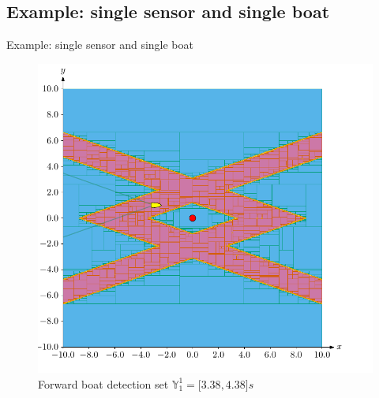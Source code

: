 \documentclass{beamer}
\begin{document}
        \subsection{Example: single sensor and single boat}

            \begin{frame}{Example: single sensor and single boat}
                \begin{minipage}{0.45\textwidth}
                    \begin{figure}
                            \includegraphics[width=\textwidth]{imgs/forward}
                            \caption{Forward boat detection set $\mathbb{Y}_1^1 = \lbrack3.38, 4.38\rbrack s$}
                    \end{figure}
                \end{minipage}
                \hfill
                \begin{minipage}{0.45\textwidth}
                    \begin{figure}

\end{figure}
\end{minipage}
\end{frame}
\end{document}
